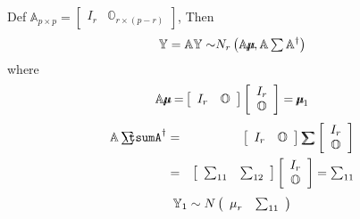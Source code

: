 \documentclass{article}
\begin{document}
\setcounter{part}{1} \setcounter{page}{1}

Def $\mathbb{A}_{p\times p}=\left[ 
\begin{array}{cc}
I_{r} & \mathbb{O}_{r\times \left( p-r\right) }%
\end{array}%
\right] $, \newline
Then%
\begin{equation*}
\mathbb{Y=AY\sim }N_{r}\left( \mathbb{A%
\mu\mkern-12.6mu\mu%
},\mathbb{A}\tsum \mathbb{A}^{\dagger }\right)
\end{equation*}%
where%
\begin{equation*}
\mathbb{A%
\mu\mkern-12.3mu\mu%
=}\left[ 
\begin{array}{cc}
I_{r} & \mathbb{O}%
\end{array}%
\right] \left[ 
\begin{array}{c}
I_{r} \\ 
\mathbb{O}%
\end{array}%
\right] =\mathbb{%
\mu\mkern-12.3mu\mu%
}_{1}
\end{equation*}%
\begin{eqnarray*}
\mathbb{A%
\tsum\mkern-20mu\tsum%
A}^{\dagger } &=&\left[ 
\begin{array}{cc}
I_{r} & \mathbb{O}%
\end{array}%
\right] \mathbb{%
\tsum\mkern-20mu\tsum%
}\left[ 
\begin{array}{c}
I_{r} \\ 
\mathbb{O}%
\end{array}%
\right] \\
&=&\left[ 
\begin{array}{cc}
\tsum\nolimits_{11} & \tsum\nolimits_{12}%
\end{array}%
\right] \left[ 
\begin{array}{c}
I_{r} \\ 
\mathbb{O}%
\end{array}%
\right] =\tsum\nolimits_{11}
\end{eqnarray*}%
\begin{equation*}
\therefore \mathbb{Y}_{1}\sim N\left( 
\begin{array}{cc}
\mu _{r} & \tsum\nolimits_{11}%
\end{array}%
\right)
\end{equation*}
\end{document}
